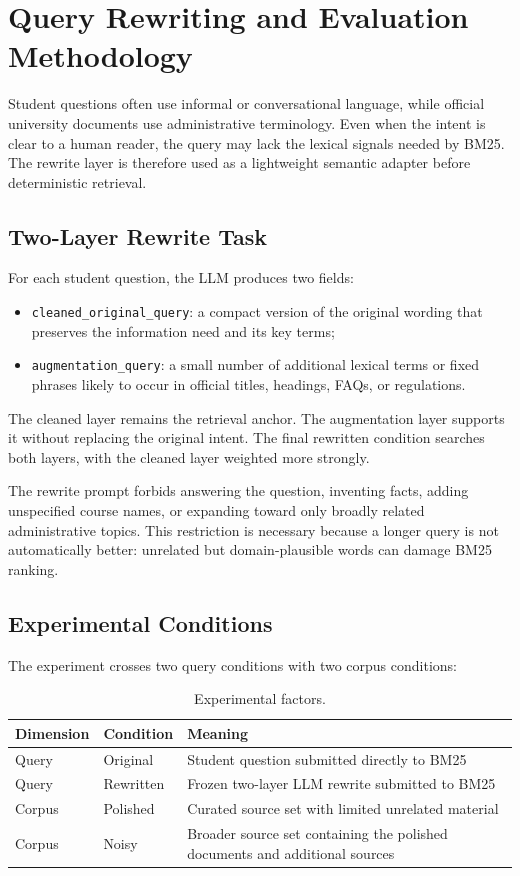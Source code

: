 \chapter{Query Rewriting and Evaluation Methodology}

Student questions often use informal or conversational language, while official university documents use administrative terminology. Even when the intent is clear to a human reader, the query may lack the lexical signals needed by BM25. The rewrite layer is therefore used as a lightweight semantic adapter before deterministic retrieval.

\section{Two-Layer Rewrite Task}
For each student question, the LLM produces two fields:

\begin{itemize}
    \item \texttt{cleaned\_original\_query}: a compact version of the original wording that preserves the information need and its key terms;
    \item \texttt{augmentation\_query}: a small number of additional lexical terms or fixed phrases likely to occur in official titles, headings, FAQs, or regulations.
\end{itemize}

The cleaned layer remains the retrieval anchor. The augmentation layer supports it without replacing the original intent. The final rewritten condition searches both layers, with the cleaned layer weighted more strongly.

The rewrite prompt forbids answering the question, inventing facts, adding unspecified course names, or expanding toward only broadly related administrative topics. This restriction is necessary because a longer query is not automatically better: unrelated but domain-plausible words can damage BM25 ranking.

\section{Experimental Conditions}
The experiment crosses two query conditions with two corpus conditions:

\begin{table}[h]
\centering
\begin{tabular}{lll}
\toprule
\textbf{Dimension} & \textbf{Condition} & \textbf{Meaning} \\
\midrule
Query & Original & Student question submitted directly to BM25 \\
Query & Rewritten & Frozen two-layer LLM rewrite submitted to BM25 \\
Corpus & Polished & Curated source set with limited unrelated material \\
Corpus & Noisy & Broader source set containing the polished documents and additional sources \\
\bottomrule
\end{tabular}
\caption{Experimental factors.}
\label{tab:experimental-factors}
\end{table}

